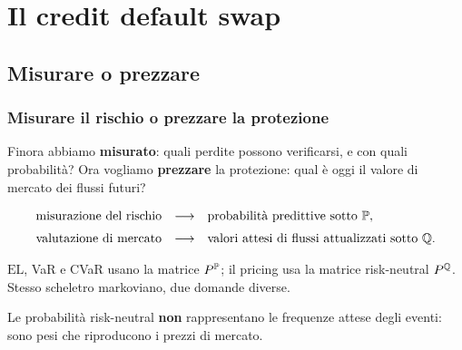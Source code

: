 

\section{Il credit default swap}

\subsection{Misurare o prezzare}%

\begin{frame}%
%

\frametitle{Misurare il rischio o prezzare la protezione}%
%

%


Finora abbiamo \textbf{misurato}: quali perdite possono verificarsi, e con
quali probabilit\`{a}? Ora vogliamo \textbf{prezzare} la protezione: qual
\`{e} oggi il valore di mercato dei flussi futuri?

\medskip%

\[%
\begin{array}
[c]{ccl}%
\text{misurazione del rischio} & \longrightarrow & \text{probabilit\`{a}
predittive sotto }\Prob,\\[2mm]%
\text{valutazione di mercato} & \longrightarrow & \text{valori attesi di
flussi attualizzati sotto }\Q.
\end{array}
\]


\medskip

\begin{stepitemize}
\item $\mathrm{EL}$, VaR e CVaR usano la matrice $P^{\mathbb{P}}$; il pricing usa
la matrice risk-neutral $P^{\mathbb{Q}}$. Stesso scheletro markoviano, due domande diverse.

\item Le probabilit\`{a} risk-neutral \textbf{non} rappresentano le frequenze
attese degli eventi: sono pesi che riproducono i prezzi di mercato.
\end{stepitemize}

%

\transboxout
\end{frame}%


